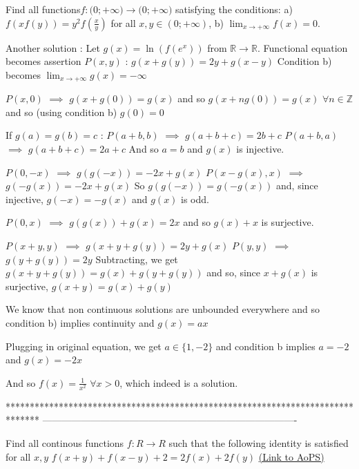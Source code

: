 \begin{solution}
	\begin{tcolorbox}Find all functions$f: \mathbb(0;+\infty)\to\mathbb(0;+\infty)$ satisfying the conditions: a) $f(xf(y))=y^2f(\frac{x}{y})$ for all $x,y{\in}(0;+\infty)$, b) $\lim_{x\to+\infty}f(x)=0$.\end{tcolorbox}
Another solution :
Let $g(x)=\ln(f(e^x))$ from $\mathbb R\to \mathbb R$. 
Functional equation becomes assertion $P(x,y)$ : $g(x+g(y))=2y+g(x-y)$
Condition b) becomes $\lim_{x\to+\infty}g(x)=-\infty$

$P(x,0)$ $\implies$ $g(x+g(0))=g(x)$ and so $g(x+ng(0))=g(x)$ $\forall n\in\mathbb Z$ and so (using condition b) $g(0)=0$ 

If $g(a)=g(b)=c$ :
$P(a+b,b)$ $\implies$ $g(a+b+c)=2b+c$
$P(a+b,a)$ $\implies$ $g(a+b+c)=2a+c$
And so $a=b$ and $g(x)$ is injective.

$P(0,-x)$ $\implies$ $g(g(-x))=-2x+g(x)$
$P(x-g(x),x)$ $\implies$ $g(-g(x))=-2x+g(x)$
So $g(g(-x))=g(-g(x))$ and, since injective, $g(-x)=-g(x)$ and $g(x)$ is odd.

$P(0,x)$ $\implies$ $g(g(x))+g(x)=2x$ and so $g(x)+x$ is surjective.

$P(x+y,y)$ $\implies$ $g(x+y+g(y))=2y+g(x)$
$P(y,y)$ $\implies$ $g(y+g(y))=2y$
Subtracting, we get $g(x+y+g(y))=g(x)+g(y+g(y))$ and so, since $x+g(x)$ is surjective, $g(x+y)=g(x)+g(y)$

We know that non continuous solutions are unbounded everywhere and so condition b) implies continuity and $g(x)=ax$

Plugging in original equation, we get $a\in\{1,-2\}$ and condition b implies $a=-2$ and $g(x)=-2x$

And so $\boxed{f(x)=\frac 1{x^2}}$ $\forall x>0$, which indeed is a solution.
\end{solution}
*******************************************************************************
-------------------------------------------------------------------------------

\begin{problem}
	Find all continous functions $f: R \to R$ such that the following identity is satisfied for all $x,y$ 
   $f(x+y)+f(x-y)+2=2f(x)+2f(y)$
	\flushright \href{https://artofproblemsolving.com/community/c6h570759}{(Link to AoPS)}
\end{problem}



